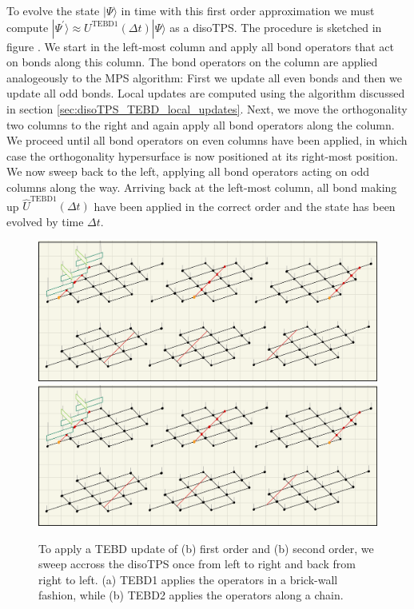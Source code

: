 To evolve the state $|\Psi\rangle$ in time with this first order approximation we must compute $|\Psi^\prime\rangle \approx U^\text{TEBD1}(\Delta t)|\Psi\rangle$ as a disoTPS. The procedure is sketched in figure . We start in the left-most column and apply all bond operators that act on bonds along this column. The bond operators on the column are applied analogeously to the MPS algorithm: First we update all even bonds and then we update all odd bonds. Local updates are computed using the algorithm discussed in section \ref{sec:disoTPS_TEBD_local_updates}. Next, we move the orthogonality two columns to the right and again apply all bond operators along the column. We proceed until all bond operators on even columns have been applied, in which case the orthogonality hypersurface is now positioned at its right-most position. We now sweep back to the left, applying all bond operators acting on odd columns along the way. Arriving back at the left-most column, all bond making up $\hat{U}^\text{TEBD1}(\Delta t)$ have been applied in the correct order and the state has been evolved by time $\Delta t$.
\begin{figure}
	\centering
	\subcaptionbox{\label{fig:disoTPS_TEBD_global_update_applying_TEBD1}}
	{%
		\includegraphics[width=1.0\textwidth]{figures/disoTPS/disoTPS_TEBD1_global_update.jpeg}
	}
	\subcaptionbox{\label{fig:disoTPS_TEBD_global_update_applying_TEBD2}}
	{%
		\includegraphics[width=1.0\textwidth]{figures/disoTPS/disoTPS_TEBD1_global_update.jpeg}
	}
	\caption{To apply a TEBD update of (b) first order and (b) second order, we sweep accross the disoTPS once from left to right and back from right to left. (a) TEBD1 applies the operators in a brick-wall fashion, while (b) TEBD2 applies the operators along a chain. }
	\label{fig:disoTPS_TEBD_global_update_applying_TEBD}
\end{figure}
